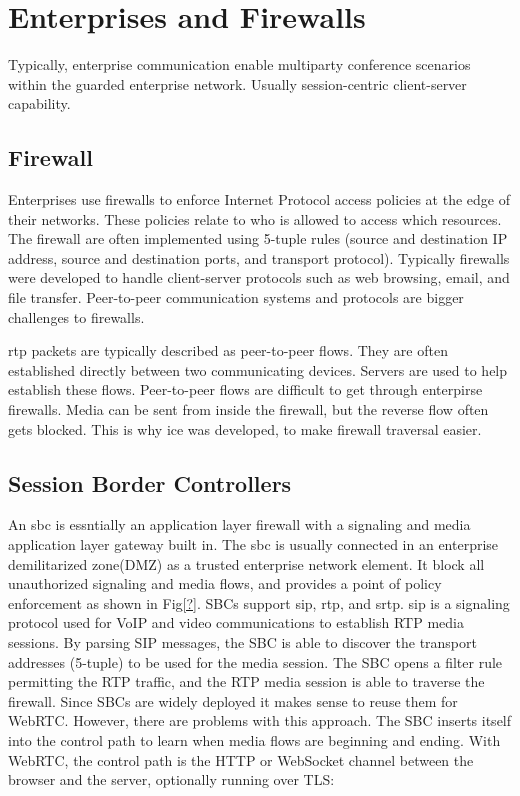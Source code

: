 \section{Enterprises and Firewalls}



Typically, enterprise communication enable multiparty conference scenarios within the guarded enterprise network. Usually session-centric client-server capability.

\subsection{Firewall}
Enterprises use firewalls to enforce Internet Protocol access policies at the edge of their networks. These policies relate to who is allowed to access which resources. The firewall are often implemented using 5-tuple rules (source and destination IP address, source and destination ports, and transport protocol). Typically firewalls were developed to handle client-server protocols such as web browsing, email, and file transfer\cite{ieeexplore}. Peer-to-peer communication systems and protocols are bigger challenges to firewalls.

\gls{rtp} packets are typically described as peer-to-peer flows. They are often established directly between two communicating devices. Servers are used to help establish these flows. Peer-to-peer flows are difficult to get through enterpirse firewalls. Media can be sent from inside the firewall, but the reverse flow often gets blocked. This is why \gls{ice} was developed, to make firewall traversal easier.

\subsection{Session Border Controllers}
An \gls{sbc} is essntially an application layer firewall with a signaling and media application layer gateway built in. The \gls{sbc} is usually connected in an enterprise demilitarized zone(DMZ) as a trusted enterprise network element. It block all unauthorized signaling and media flows, and provides a point of policy enforcement as shown in Fig\ref{?}. SBCs support \gls{sip}, \gls{rtp}, and \gls{srtp}. \gls{sip} is a signaling protocol used for VoIP and video communications to establish RTP media sessions. By parsing SIP messages, the SBC is able to discover the transport addresses (5-tuple) to be used for the media session. The SBC opens a filter rule permitting the RTP traffic, and the RTP media session is able to traverse the firewall. Since SBCs are widely deployed it makes sense to reuse them for WebRTC. However, there are problems with this approach. The SBC inserts itself into the control path to learn when media flows are beginning and ending. With WebRTC, the control path is the HTTP or WebSocket channel between the browser and the server, optionally running over TLS: 

